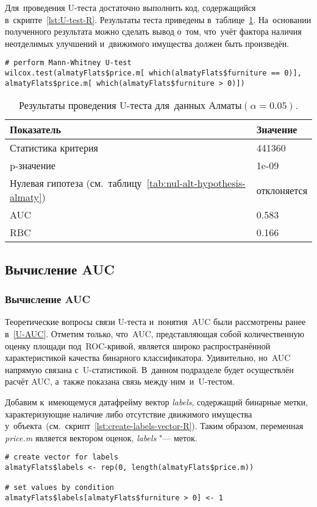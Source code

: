 \documentclass[]{scrreprt}
\begin{document}
Для~проведения U-теста достаточно выполнить код, содержащийся в~скрипте~\ref{lst:U-test-R}. Результаты теста приведены в~таблице~\ref{tab:u-test-r-result}. На~основании полученного результата можно сделать вывод о~том, что~учёт фактора наличия неотделимых улучшений и~движимого имущества должен быть произведён.
%
\begin{lstlisting}[float, caption = Проведение U-теста для данных города Алматы, firstnumber=1, label= lst:U-test-R]
# perform Mann-Whitney U-test
wilcox.test(almatyFlats$price.m[ which(almatyFlats$furniture == 0)],
almatyFlats$price.m[ which(almatyFlats$furniture > 0)]) 
\end{lstlisting}
%
\begin{table}[ht]
	\caption{Результаты проведения U-теста для~данных Алматы$({\textstyle \alpha=0.05})$.}\label{tab:u-test-r-result}
	\centering
	\begin{tabular}{ll}
		\hline
		Показатель&Значение\\
		\hline
		Статистика критерия&441360\\
		\hline
		p-значение&1e-09\\
		\hline
		Нулевая гипотеза (см.~таблицу~\ref{tab:nul-alt-hypothesis-almaty})&отклоняется\\
		\hline
		AUC&0.583\\
		\hline
		RBC&0.166\\
		\hline
	\end{tabular}
\end{table}
%
\subsection{Вычисление AUC}

\subsubsection{Вычисление AUC}\label{AUC-almaty}
Теоретические вопросы связи U-теста и~понятия~AUC были рассмотрены ранее в~\ref{U-AUC}. Отметим только, что~AUC, представляющая собой количественную оценку площади под~ROC-кривой, является широко распространённой характеристикой качества бинарного классификатора. Удивительно, но~AUC напрямую связана с~U-статистикой. В~данном подразделе будет осуществлён расчёт AUC, а~также показана связь между ним~и~U-тестом.

Добавим к~имеющемуся датафрейму вектор \textit{labels}, содержащий бинарные метки, характеризующие наличие либо отсутствие движимого имущества у~объекта~(см.~скрипт~\ref{lst:create-labels-vector-R}). Таким образом, переменная \textit{price.m} является вектором оценок, \textit{labels} "--- меток.
%
\begin{lstlisting}[float, caption = Добавление переменной с~бинарными метками, firstnumber=1, label= lst:create-labels-vector-R]
# create vector for labels
almatyFlats$labels <- rep(0, length(almatyFlats$price.m))

# set values by condition
almatyFlats$labels[almatyFlats$furniture > 0] <- 1
\end{lstlisting}
%
\end{document}
